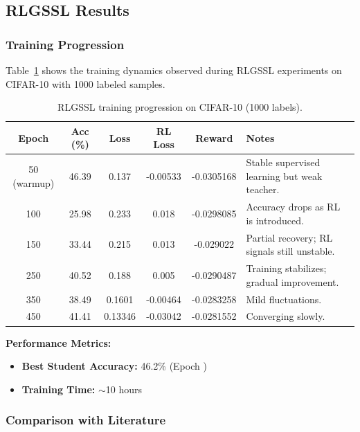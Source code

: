 \documentclass{scrartcl}
\begin{document}
\subsection{RLGSSL Results}

\subsubsection{Training Progression}

Table~\ref{tab:rlgssl_training} shows the training dynamics observed during RLGSSL experiments on CIFAR-10 with 1000 labeled samples.

\begin{table}[H]
    \centering
    \begin{tabular}{cccccl}
        \hline
        \textbf{Epoch} & \textbf{Acc (\%)} & \textbf{Loss} & \textbf{RL Loss} & \textbf{Reward} & \textbf{Notes} \\
        \hline
        50 (warmup) & 46.39 & 0.137 & -0.00533 & -0.0305168 & Stable supervised learning but weak teacher. \\
        100 & 25.98 & 0.233 & 0.018 & -0.0298085 & Accuracy drops as RL is introduced. \\
        150 & 33.44 & 0.215 & 0.013 & -0.029022 & Partial recovery; RL signals still unstable. \\
        250 & 40.52 & 0.188 & 0.005 & -0.0290487 & Training stabilizes; gradual improvement. \\
        350 & 38.49 & 0.1601 & -0.00464 & -0.0283258 & Mild fluctuations. \\
        450 & 41.41 & 0.13346 & -0.03042 & -0.0281552 & Converging slowly. \\
        \hline
    \end{tabular}
    \caption{RLGSSL training progression on CIFAR-10 (1000 labels).}
    \label{tab:rlgssl_training}
\end{table}



\textbf{Performance Metrics:}
\begin{itemize}
    \item \textbf{Best Student Accuracy:} 46.2\% (Epoch )
    \item \textbf{Training Time:} $\sim$10 hours
\end{itemize}

\subsubsection{Comparison with Literature}
\end{document}
